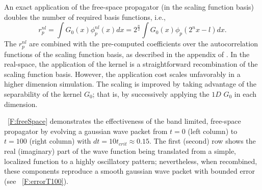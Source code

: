 \documentclass[review,letterpaper]{elsarticle}
\begin{document}
An exact application of the free-space propagator (in the scaling function basis)
doubles the number of required basis functions, i.e.,
\begin{equation}
\label{E:matElem}
r_{p}^{nl}=\int G_{0}(x)\phi _{p}^{nl}(x)dx=2^\frac n2\int G_{0}(x)\phi _{p}(2^{n}x-l)dx.
\end{equation}
The  $r_{p}^{nl}$ are combined with the pre-computed coefficients over the autocorrelation functions of the scaling function basis, as described in the appendix of \cite{mrqc1}.
In the real-space, the application of the kernel is a straightforward recombination
of the scaling function basis.  However, the application cost scales unfavorably
in a higher dimension simulation.  The scaling is improved by taking advantage
of the separability of the kernel $G_0$; that is, by successively applying the $1D$ $G_0$ in each dimension.

\figurename~\ref{F:freeSpace} demonstrates the effectiveness of the band limited, free-space propagator
by evolving a gaussian wave packet from $t = 0$ (left column) to $t = 100$ (right column) with $dt=10t_{crit}\approx0.15$.
The first (second) row shows the real (imaginary) part of the wave function being translated
from a simple, localized function to a highly oscillatory pattern; nevertheless, when recombined,
these components reproduce a smooth gaussian wave packet with bounded error (see \figurename~\ref{F:errorT100}).
\end{document}
